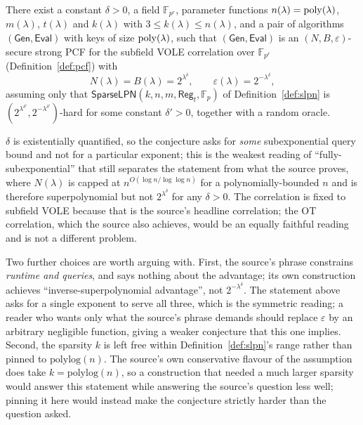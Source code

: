 \documentclass{aicr-conjecture}
\newcommand{\F}{\mathbb{F}}
\newcommand{\Gen}{\mathsf{Gen}}
\newcommand{\Eval}{\mathsf{Eval}}
\newcommand{\SparseLPN}{\mathsf{SparseLPN}}
\newcommand{\Reg}{\mathsf{Reg}}
\begin{document}
\begin{conjecture}\label{conj:main}
There exist a constant $\delta > 0$, a field $\F_{p^{r}}$, parameter
functions $n(\lambda) = \mathrm{poly}(\lambda)$, $m(\lambda)$, $t(\lambda)$ and
$k(\lambda)$ with $3 \le k(\lambda) \le n(\lambda)$, and a pair
of algorithms $(\Gen, \Eval)$ with keys of size $\mathrm{poly}(\lambda)$, such
that $(\Gen, \Eval)$ is an $(N, B, \varepsilon)$-secure strong PCF for
the subfield VOLE correlation over $\F_{p^{r}}$
(Definition~\ref{def:pcf}) with
\[
  N(\lambda) = B(\lambda) = 2^{\lambda^{\delta}},
  \qquad
  \varepsilon(\lambda) = 2^{-\lambda^{\delta}},
\]
assuming only that
$\SparseLPN(k, n, m, \Reg_{t}, \F_{p})$ of
Definition~\ref{def:slpn} is $(2^{\lambda^{\delta'}},
2^{-\lambda^{\delta'}})$-hard for some constant $\delta' > 0$, together
with a random oracle.
\end{conjecture}

\begin{remark}
$\delta$ is existentially quantified, so the conjecture asks for
\emph{some} subexponential query bound and not for a particular
exponent; this is the weakest reading of ``fully-subexponential'' that
still separates the statement from what the source proves, where
$N(\lambda)$ is capped at $n^{O(\log n / \log\log n)}$ for a
polynomially-bounded $n$ and is therefore superpolynomial but not
$2^{\lambda^{\delta}}$ for any $\delta > 0$. The correlation is fixed to
subfield VOLE because that is the source's headline correlation; the OT
correlation, which the source also achieves, would be an equally
faithful reading and is not a different problem.

Two further choices are worth arguing with. First, the source's phrase
constrains \emph{runtime and queries}, and says nothing about the
advantage; its own construction achieves ``inverse-superpolynomial
advantage'', not $2^{-\lambda^{\delta}}$. The statement above asks for a
single exponent to serve all three, which is the symmetric reading; a
reader who wants only what the source's phrase demands should replace
$\varepsilon$ by an arbitrary negligible function, giving a weaker
conjecture that this one implies. Second, the sparsity $k$ is left free
within Definition~\ref{def:slpn}'s range rather than pinned to
$\mathrm{polylog}(n)$. The source's own conservative flavour of the
assumption does take $k = \mathrm{polylog}(n)$, so a construction that
needed a much larger sparsity would answer this statement while
answering the source's question less well; pinning it here would instead
make the conjecture strictly harder than the question asked.
\end{remark}
\end{document}
